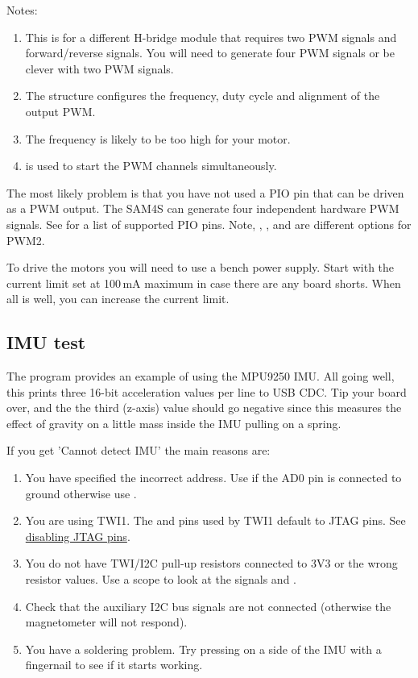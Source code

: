 Notes:
%
\begin{enumerate}
\item
  This is for a different H-bridge module that requires two PWM signals
  and forward/reverse signals. You will need to generate four PWM
  signals or be clever with two PWM signals.
\item
  The  structure configures the frequency, duty
  cycle and alignment of the output PWM.
\item The frequency is likely to be too high for your motor.
\item {} is used to start the PWM channels simultaneously.  
\end{enumerate}

The most likely problem is that you have not used a PIO pin that can
be driven as a PWM output. The SAM4S can generate four independent
hardware PWM signals. See  for a list of
supported PIO pins. Note, , , and  are
different options for PWM2.

To drive the motors you will need to use a bench power supply. Start
with the current limit set at 100\,mA maximum in case there are any
board shorts.  When all is well, you can increase the current limit.

\subsection{IMU test}
\label{imu-test}

The program  provides an
example of using the MPU9250 IMU.  All going well, this prints three
16-bit acceleration values per line to USB CDC. Tip your board over,
and the the third (z-axis) value should go negative since this
measures the effect of gravity on a little mass inside the IMU pulling
on a spring.

If you get 'Cannot detect IMU' the main reasons are:

\begin{enumerate}
\item
  You have specified the incorrect address. Use  if the
  AD0 pin is connected to ground otherwise use .
\item
  You are using TWI1. The  and  pins used by TWI1 default to JTAG
  pins. See \protect\hyperref[disabling-jtag-pins]{disabling JTAG pins}.
\item
  You do not have TWI/I2C pull-up resistors connected to 3V3 or the
  wrong resistor values. Use a scope to look at the signals 
  and .
\item
  Check that the auxiliary I2C bus signals are not connected
  (otherwise the magnetometer will not respond).  
\item
  You have a soldering problem. Try pressing on a side of the IMU with a
  fingernail to see if it starts working.
\end{enumerate}

